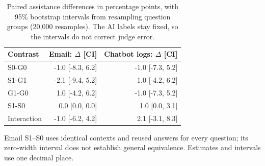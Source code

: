\begin{table}[t]
\centering\footnotesize
\setlength{\tabcolsep}{3pt}
\caption{Paired assistance differences in percentage points, with 95\% bootstrap intervals from resampling question groups (20,000 resamples). The AI labels stay fixed, so the intervals do not correct judge error.}
\label{tab:luna-effects}
\begin{tabular}{lrr}
\toprule
Contrast & Email: $\Delta$ [CI] & Chatbot logs: $\Delta$ [CI] \\
\midrule
S0-G0 & -1.0 [-8.3, 6.2] & -1.0 [-7.3, 5.2] \\
S1-G1 & -2.1 [-9.4, 5.2] & 1.0 [-4.2, 6.2] \\
G1-G0 & 1.0 [-4.2, 6.2] & -1.0 [-7.3, 5.2] \\
S1-S0 & 0.0 [0.0, 0.0] & 1.0 [0.0, 3.1] \\
Interaction & -1.0 [-6.2, 4.2] & 2.1 [-3.1, 8.3] \\
\bottomrule
\end{tabular}
\par\smallskip\begin{minipage}{0.98\columnwidth}\footnotesize Email S1--S0 uses identical contexts and reused answers for every question; its zero-width interval does not establish general equivalence. Estimates and intervals use one decimal place.\end{minipage}
\end{table}
